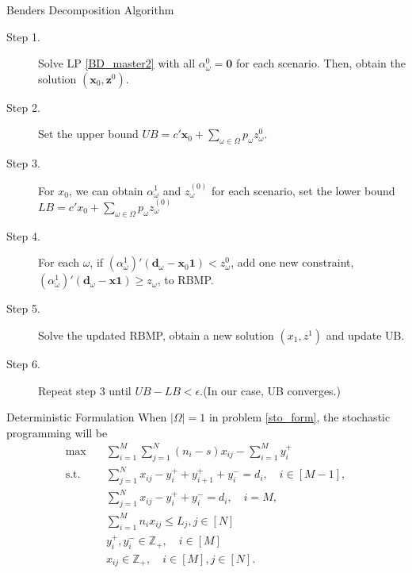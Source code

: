 \begin{frame}{Benders Decomposition Algorithm}
  \begin{description}
    \item[Step 1.] Solve LP \ref{BD_master2} with all $\alpha_{\omega}^0 = \mathbf{0}$ for each scenario.
    Then, obtain the solution $(\mathbf{x}_0, \mathbf{z}^{0})$.

    \item[Step 2.] Set the upper bound $UB = c{'} \mathbf{x}_0 + \sum_{\omega \in \Omega} p_{\omega} z_{\omega}^{0}$.
    \item[Step 3.] 
    For $x_0$, we can obtain $\alpha_{\omega}^{1}$ and $z_{\omega}^{(0)}$ for each scenario, set the lower bound $LB = c{'} x_0 + \sum_{\omega \in \Omega} p_{\omega} z_{\omega}^{(0)}$
    \item[Step 4.]
    For each $\omega$, if $(\alpha_{\omega}^{1}){'}(\mathbf{d}_{\omega}- \mathbf{x}_0 \mathbf{1}) < z_{\omega}^{0}$, add one new constraint, $(\alpha_{\omega}^{1}){'}(\mathbf{d}_{\omega}- \mathbf{x} \mathbf{1}) \geq z_{\omega}$, to RBMP.
    \item[Step 5.] Solve the updated RBMP, obtain a new solution $(x_1, z^{1})$ and update UB.
    \item[Step 6.] Repeat step 3 until $UB - LB < \epsilon$.(In our case, UB converges.)
   \end{description}
\end{frame}

\begin{frame}{Deterministic Formulation}
  When $|\Omega| =1$ in problem \eqref{sto_form}, the stochastic programming will be 
  \small
  \begin{equation}\label{one_form}
    \begin{aligned}
    \max \quad & \sum_{i=1}^{M}  \sum_{j= 1}^{N} (n_i-s) x_{ij} - \sum_{i=1}^{M} y_{i}^{+}  \\
    \text {s.t.} \quad & \sum_{j= 1}^{N} x_{ij} - y_{i}^{+}+ y_{i+1}^{+} + y_{i}^{-} = d_{i}, \quad i \in [M-1], \\
    & \sum_{j= 1}^{N} x_{ij} -y_{i}^{+} + y_{i}^{-} = d_{i}, \quad i = M, \\
    & \sum_{i=1}^{M} n_{i} x_{ij} \leq L_j, j \in [N]\\
    & y_{i}^{+}, y_{i}^{-} \in \mathbb{Z}_{+}, \quad i \in [M] \\
    & x_{ij} \in \mathbb{Z}_{+}, \quad i \in [M], j \in [N].
    \end{aligned}
  \end{equation}
\end{frame}


